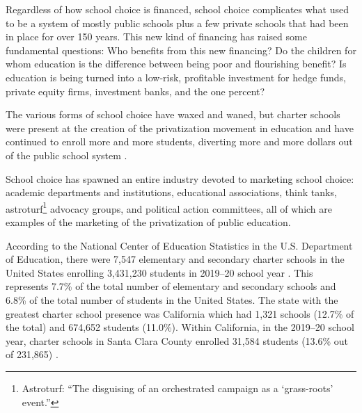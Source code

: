 Regardless of how school choice is financed, school choice complicates what used to be a system of mostly public schools plus a few private schools that had been in place for over 150 years. This new kind of financing has raised some fundamental questions: Who benefits from this new financing? Do the children for whom education is the difference between being poor and flourishing benefit? Is education is being turned into a low-risk, profitable investment for hedge funds, private equity firms, investment banks, and the one percent?

The various forms of school choice have waxed and waned, but charter schools were present at the creation of the privatization movement in education and have continued to enroll more and more students, diverting more and more dollars out of the public school system \parencites{Lafer2017a}{Lafer2018}{Lafer.etal2021}.
\begin{comment}
  \parencites[131–132]{Lafer2017a}[18]{Lafer2018}[9]{Lafer.etal2021}
\end{comment}
School choice has spawned an entire industry devoted to marketing school choice: academic departments and institutions, educational associations, think tanks, astroturf\footnote{Astroturf: ``The disguising of an orchestrated campaign as a `grass-roots' event.''} advocacy groups, and political action committees, all of which are examples of the marketing of the privatization of public education. %

According to the National Center of Education Statistics in the U.S. Department of Education, there were 7,547 elementary and secondary charter schools in the United States enrolling 3,431,230 students in 2019–20 school year \parencite[Table 216.90, p.144]{DeBrey.etal2022}. This represents 7.7\% of the total number of elementary and secondary schools and 6.8\% of the total number of students in the United States. The state with the greatest charter school presence was California which had 1,321 schools (12.7\% of the total) and 674,652 students (11.0\%). Within California, in the 2019–20 school year, charter schools in Santa Clara County enrolled 31,584 students (13.6\% out of 231,865) \parencite{CDEDataQuest2021}.

